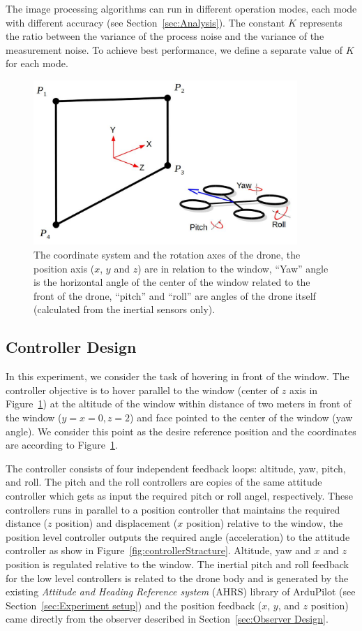 \documentclass[ twoside, 12pt ]{article}
\begin{document}
The image processing algorithms can run in different operation modes, each mode with different accuracy (see Section~\ref{sec:Analysis}).
The constant $K$ represents the ratio between the variance of the process noise and the variance of the measurement noise. To achieve best performance, we define a separate value of $K$ for each mode.

\begin{figure} %
    \centerline{\includegraphics[width=100mm]{axis.jpg}}
    \caption{The coordinate system and the rotation axes of the drone, the position axis ($x$, $y$ and $z$) are in relation to the window, ``Yaw'' angle is the horizontal angle of the center of the window related to the front of the drone, ``pitch'' and ``roll'' are angles of the drone itself (calculated from the inertial sensors only).}
    \label{fig:axis}
\end{figure}

\subsection{Controller Design}
\label{sec:Controller Design}

In this experiment, we consider the task of hovering in front of the window. The controller objective is to hover parallel to the window (center of $z$ axis in Figure~\ref{fig:axis}) at the altitude of the window within distance of two meters in front of the window ($y=x=0 , z=2$) and face pointed to the center of the window (yaw angle).
We consider this point as the desire reference position and the coordinates are according to Figure~\ref{fig:axis}.

The controller consists of four independent feedback loops: altitude, yaw, pitch, and roll.
The pitch and the roll controllers are copies of the same attitude controller which gets as input the required pitch or roll angel, respectively. These controllers runs in parallel to a position controller that maintains the required distance ($z$ position) and displacement ($x$ position) relative to the window, the position level controller outputs the required angle (acceleration) to the attitude controller as show in Figure~\ref{fig:controllerStracture}.
Altitude, yaw and $x$ and $z$ position is regulated relative to the window.
The inertial pitch and roll feedback for the low level controllers is related to the drone body and is generated by the existing \textit{Attitude and Heading Reference system} (AHRS) library of ArduPilot (see Section~\ref{sec:Experiment setup}) and the position feedback ($x$, $y$, and $z$ position) came directly from the observer described in Section~\ref{sec:Observer Design}.
\end{document}
